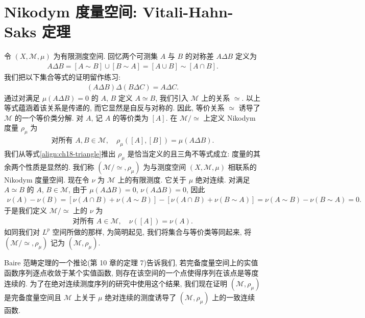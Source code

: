 \documentclass[../../main.tex]{subfiles}
\begin{document}
\section{Nikodym 度量空间: Vitali-Hahn-Saks 定理}\label{section:ch18-nikodym}

令 $(X,\mathcal{M},\mu)$ 为有限测度空间. 回忆两个可测集 $A$ 与 $B$ 的对称差 $A\Delta B$ 定义为
\begin{align*}
A\Delta B=[A\sim B]\cup[B\sim A]=[A\cup B]\sim[A\cap B].
\end{align*}
我们把以下集合等式的证明留作练习:
\begin{align}
(A\Delta B)\Delta(B\Delta C)=A\Delta C.\label{align:ch18-triangle}
\end{align}
通过对满足 $\mu(A\Delta B)=0$ 的 $A$, $B$ 定义 $A\simeq B$, 我们引入 $\mathcal{M}$ 上的关系 $\simeq$. 以上等式蕴涵着该关系是传递的, 而它显然是自反与对称的. 因此, 等价关系 $\simeq$ 诱导了 $\mathcal{M}$ 的一个等价类分解. 对 $A$, 记 $A$ 的等价类为 $[A]$. 在 $\mathcal{M}/\simeq$ 上定义 Nikodym 度量 $\rho_{\mu}$ 为
\begin{align*}
\text{对所有 }A,B\in\mathcal{M},\quad\rho_{\mu}([A],[B])=\mu(A\Delta B).
\end{align*}
我们从等式\eqref{align:ch18-triangle}推出 $\rho_{\mu}$ 是恰当定义的且三角不等式成立: 度量的其余两个性质是显然的. 我们称 $(\mathcal{M}/\simeq,\rho_{\mu})$ 为与测度空间 $(X,\mathcal{M},\mu)$ 相联系的 Nikodym 度量空间. 现在令 $\nu$ 为 $\mathcal{M}$ 上的有限测度. 它关于 $\mu$ 绝对连续. 对满足 $A\simeq B$ 的 $A$, $B\in\mathcal{M}$, 由于 $\mu(A\Delta B)=0$, $\nu(A\Delta B)=0$, 因此
\begin{align*}
\nu(A)-\nu(B)=[\nu(A\cap B)+\nu(A\sim B)]-[\nu(A\cap B)+\nu(B\sim A)]=\nu(A\sim B)-\nu(B\sim A)=0.
\end{align*}
于是我们定义 $\mathcal{M}/\simeq$ 上的 $\nu$ 为
\begin{align*}
\text{对所有 }A\in\mathcal{M},\quad\nu([A])=\nu(A).
\end{align*}
如同我们对 $L^{p}$ 空间所做的那样, 为简明起见, 我们将集合与等价类等同起来, 将 $(\mathcal{M}/\simeq,\rho_{\mu})$ 记为 $(\mathcal{M},\rho_{\mu})$.

Baire 范畴定理的一个推论(第 10 章的定理 7)告诉我们, 若完备度量空间上的实值函数序列逐点收敛于某个实值函数, 则存在该空间的一个点使得序列在该点是等度连续的. 为了在绝对连续测度序列的研究中使用这个结果, 我们现在证明 $(\mathcal{M},\rho_{\mu})$ 是完备度量空间且 $\mathcal{M}$ 上关于 $\mu$ 绝对连续的测度诱导了 $(\mathcal{M},\rho_{\mu})$ 上的一致连续函数.
\end{document}
